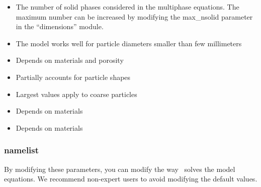 \begin{itemize}

\item
{}
{The number of solid phases considered in the multiphase equations.
The maximum number can be increased by modifying the max\_nsolid parameter
in the ``dimensions'' module.}

\item
{}
{The model works well for particle diameters smaller than few millimeters}

\item
{}
{Depends on materials and porosity}

\item
{}
{Partially accounts for particle shapes}

\item
{}
{Largest values apply to coarse particles}

\item
{}
{Depends on materials}

\item
{}
{Depends on materials}

\end{itemize}

\subsubsection{ namelist}
By modifying these parameters, you can modify the way \PDAC\ solves the 
model equations. We recommend non-expert users to avoid modifying the
default values.

